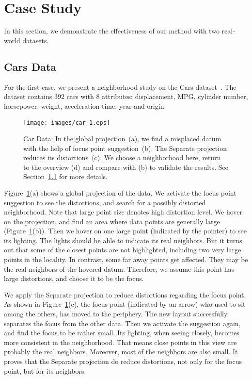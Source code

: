 \section{Case Study}
\label{section:casestudy}
In this section, we demonstrate the effectiveness of our method with two real-world datasets.

\subsection{Cars Data}
\label{case:car}
For the first case, we present a neighborhood study on the Cars dataset~\cite{Lichman:2013}. The dataset contains 392 cars with 8 attributes: displacement, MPG, cylinder number, horsepower, weight, acceleration time, year and origin.

\begin{figure}[htbp]
\centering
  \texttt{[image: images/car\_1.eps]}%
  \caption{Car Data: In the global projection~(a), we find a misplaced datum with the help of focus point suggestion~(b). The Separate projection reduces its distortions~(c). We choose a neighborhood here, return to the overview (d) and compare with (b) to validate the results. See Section~\ref{case:car} for more details.}
\label{fig:car}
  \end{figure}

Figure~\ref{fig:car}(a) shows a global projection of the data. We activate the focus point suggestion to see the distortions, and search for a possibly distorted neighborhood. Note that large point size denotes high distortion level. We hover on the projection, and find an area where data points are generally large (Figure~\ref{fig:car}(b)). Then we hover on one large point (indicated by the pointer) to see its lighting. The lights should be able to indicate its real neighbors. But it turns out that some of the closest points are not highlighted, including two very large points in the locality. In contrast, some far away points get affected. They may be the real neighbors of the hovered datum. Therefore, we assume this point has large distortions, and choose it to be the focus.

We apply the Separate projection to reduce distortions regarding the focus point. As shown in Figure~\ref{fig:car}(c), the focus point (indicated by an arrow) who used to sit among the others, has moved to the periphery. The new layout successfully separates the focus from the other data. Then we activate the suggestion again, and find the focus to be rather small. Its lighting, when seeing closely, becomes more consistent in the neighborhood. That means close points in this view are probably the real neighbors. Moreover, most of the neighbors are also small. It proves that the Separate projection do reduce distortions, not only for the focus point, but for its neighbors.

